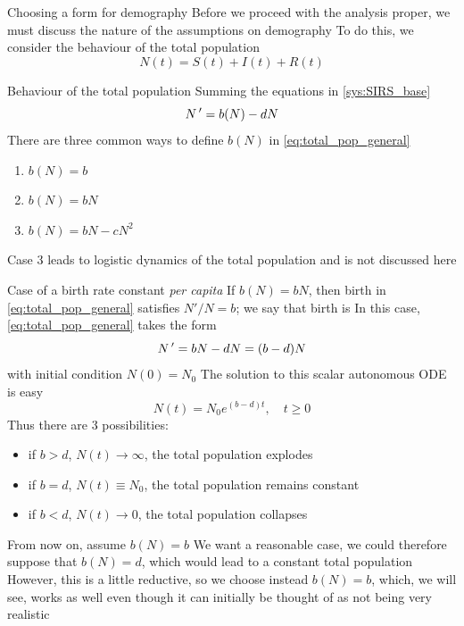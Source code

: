 \documentclass[aspectratio=169]{beamer}\usepackage[]{graphicx}\usepackage[]{xcolor}
\begin{document}
\begin{frame}{Choosing a form for demography}
Before we proceed with the analysis proper, we must discuss the nature of the assumptions on demography
\vfill
To do this, we consider the behaviour of the total population 
\[
N(t)=S(t)+I(t)+R(t)
\]
\end{frame}

\begin{frame}{Behaviour of the total population}
Summing the equations in \eqref{sys:SIRS_base}
\begin{equation}\label{eq:total_pop_general}
N\,'=b(N)-dN
\end{equation}
\vfill
There are three common ways to define $b(N)$ in \eqref{eq:total_pop_general}
\begin{enumerate}
\item $b(N)=b$
\item $b(N)=bN$
\item $b(N)=bN-cN^2$
\end{enumerate}
\vfill
Case 3 leads to logistic dynamics of the total population and is not discussed here
\end{frame}


\begin{frame}{Case of a birth rate constant \emph{per capita}}
If $b(N)=bN$, then birth in \eqref{eq:total_pop_general} satisfies $N'/N=b$; we say that birth is 
\vfill
In this case, \eqref{eq:total_pop_general} takes the form
\[
N\,'=bN-dN=(b-d)N
\]
with initial condition $N(0)=N_0$
\vfill
The solution to this scalar autonomous ODE is easy
\[
N(t)=N_0e^{(b-d)t},\quad t\geq 0
\]
Thus there are 3 possibilities:
\begin{itemize}
  \item if $b>d$, $N(t)\to\infty$, the total population explodes 
  \item if $b=d$, $N(t)\equiv N_0$, the total population remains constant 
  \item if $b<d$, $N(t)\to 0$, the total population collapses
\end{itemize}
\end{frame}

\begin{frame}{From now on, assume $b(N)=b$}
\bbullet We want a reasonable case, we could therefore suppose that $b(N)=d$, which would lead to a constant total population
\vfill
\bbullet However, this is a little reductive, so we choose instead $b(N)=b$, which, we will see, works as well even though it can initially be thought of as not being very realistic
\end{frame}
\end{document}
